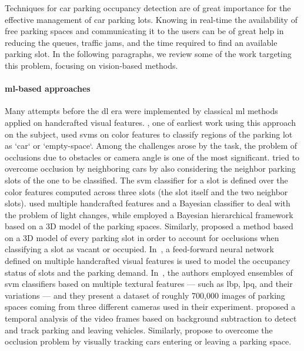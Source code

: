 Techniques for car parking occupancy detection are of great importance for the effective management of car parking lots.
Knowing in real-time the availability of free parking spaces and communicating it to the users can be of great help in reducing the queues, traffic jams, and the time required to find an available parking slot.
In the following paragraphs, we review some of the work targeting this problem, focusing on vision-based methods.

\paragraph{\gls{ml}-based approaches}
Many attempts before the \gls{dl} era were implemented by classical \gls{ml} methods applied on handcrafted visual features.
\citet{dan2002parking}, one of earliest work using this approach on the subject, used \glspl{svm} on color features to classify regions of the parking lot as `car` or `empty-space`.
Among the challenges arose by the task, the problem of occlusions due to obstacles or camera angle is one of the most significant.
\citet{wu2007robust} tried to overcome occlusion by neighboring cars by also considering the neighbor parking slots of the one to be classified.
The \gls{svm} classifier for a slot is defined over the color features computed across three slots (the slot itself and the two neighbor slots).
\citet{tsai2007vehicle} used multiple handcrafted features and a Bayesian classifier to deal with the problem of light changes, while
\citet{huang2013vacant} employed a Bayesian hierarchical framework based on a 3D model of the parking spaces.
Similarly, \citet{delibaltov2013parking} proposed a method based on a 3D model of every parking slot in order to account for occlusions when classifying a slot as vacant or occupied.
In~\cite{jermsurawong2014one}, a feed-forward neural network defined on multiple handcrafted visual features is used to model the occupancy status of slots and the parking demand.
In~\cite{de2015pklot}, the authors employed ensembles of \gls{svm} classifiers based on multiple textural features --- such as \gls{lbp}, \gls{lpq}, and their variations --- and they present a dataset of roughly 700,000 images of parking spaces coming from three different cameras used in their experiment.
\citet{del2015vacant} proposed a temporal analysis of the video frames based on background subtraction to detect and track parking and leaving vehicles.
Similarly, \citet{masmoudi2014} propose to overcome the occlusion problem by visually tracking cars entering or leaving a parking space.

